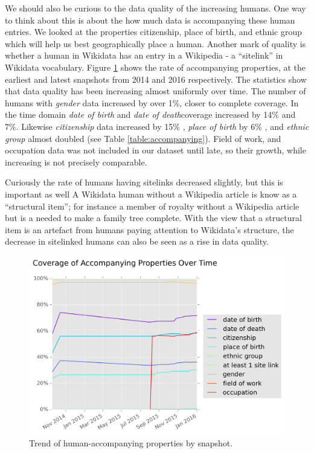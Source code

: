 \documentclass[letterpaper]{article}
\begin{document}
We should also be curious to the data quality of the increasing humans. One way to think about this is about the how much data is accompanying these human entries. We looked at the properties citizenship, place of birth, and ethnic group which will help us best geographically place a human. Another mark of quality is whether a human in Wikidata has an entry in a Wikipedia - a ``sitelink'' in Wikidata vocabulary. Figure \ref{fig:accompanying} shows the rate of accompanying properties, at the earliest and latest snapshots from 2014 and 2016 respectively. The statistics show that data quality has been increasing almost uniformly over time. The number of humans with \textit{gender} data increased by over 1\%, closer to complete coverage. In the time domain \textit{date of birth} and \textit{date of death}coverage increased by 14\% and 7\%. Likewise \textit{citizenship} data increased by 15\% , \textit{place of birth} by 6\% , and \textit{ethnic group} almost doubled (see Table \ref{table:accompanying}). Field of work, and occupation data was not included in our dataset until late, so their growth, while increasing is not precisely comparable.

Curiously the rate of humans having sitelinks decreased slightly, but this is important as well A Wikidata human without a Wikipedia article is know as a ``structural item''; for instance a member of royalty without a Wikipedia article but is a needed to make a family tree complete. With the view that a structural item is an artefact from humans paying attention to Wikidata's structure, the decrease in sitelinked humans can also be seen as a rise in data quality.


\begin{figure}
\label{fig:accompanying}
\includegraphics[scale=0.5]{figures/additionalprops.png} 
\caption{Trend of human-accompanying properties by snapshot.}
\end{figure}
\end{document}
